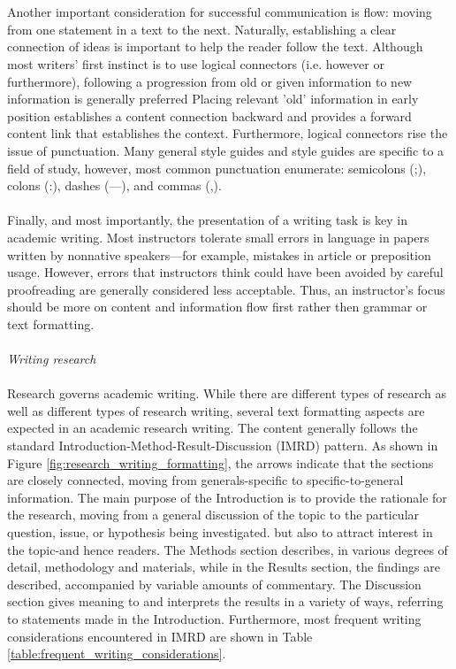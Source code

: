 \\\\
Another important consideration for successful communication is flow: moving from one statement in a text to the next. Naturally, establishing a clear connection of ideas is important to help the reader follow the text. 
Although most writers' first instinct is to use logical connectors (i.e. however or furthermore), following a progression from old or given information to new information is generally preferred
Placing relevant 'old' information in early position establishes a content connection backward and provides a forward content link that establishes the context. 
Furthermore, logical connectors rise the issue of punctuation.
Many general style guides and style guides are specific to a  field of study, however, most common punctuation enumerate: semicolons (;), colons (:), dashes (—), and commas (,).
\\\\
Finally, and most importantly, the presentation of a writing task is key in academic writing.
Most instructors tolerate small errors in language in papers written by nonnative speakers—for example, mistakes in article or preposition usage. 
However, errors that instructors think could have been avoided by careful proofreading are generally considered less acceptable.
Thus, an instructor's focus should be more on content and information flow first rather then grammar or text formatting.
\\\\
\textit{Writing research}
\\\\
Research governs academic writing. 
While there are different types of research as well as different types of research writing, several text formatting aspects are expected in an academic research writing.
The content generally follows the standard Introduction-Method-Result-Discussion (IMRD) pattern. 
As shown in Figure \ref{fig:research_writing_formatting}, the arrows indicate that the sections are closely connected, moving from generals-specific to specific-to-general information.
The main purpose of the Introduction is to provide the rationale for the research, moving from a general discussion of the topic to the particular question, issue, or hypothesis being investigated. but also to attract interest in the topic-and hence readers.
The Methods section describes, in various degrees of detail, methodology and materials, while in the Results section, the findings are described, accompanied by variable amounts of commentary.
The Discussion section gives meaning to and interprets the results in a variety of ways, referring to statements made in the Introduction.
Furthermore, most frequent writing considerations encountered in IMRD are shown in Table \ref{table:frequent_writing_considerations}.

